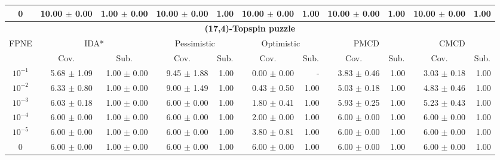 \documentclass[letterpaper]{article}
\begin{document}
\begin{table}[t]
\begin{tabular}{| c | r  r | r  r | r  r | r  r | r  r |}
0 	& 10.00 $\pm$ 0.00	& 1.00  $\pm$ 0.00 	& 10.00 $\pm$ 0.00	& 1.00 	& 10.00 $\pm$ 0.00	& 1.00 	& 10.00 $\pm$ 0.00	& 1.00 	& 10.00 $\pm$ 0.00	& 1.00 	\\

\hline
\hline
\multicolumn{11}{|c|}{\textbf{(17,4)-Topspin puzzle}} \\
\hline
\multirow{2}{*}{FPNE}	& \multicolumn{2}{|c|}{IDA*} 	& \multicolumn{2}{|c|}{Pessimistic} 	& \multicolumn{2}{|c|}{Optimistic} 	& \multicolumn{2}{|c|}{PMCD} 	& \multicolumn{2}{|c|}{CMCD} 	\\
\cline{2-11}
	& \multicolumn{1}{c}{Cov.} & \multicolumn{1}{c|}{Sub.} 	& \multicolumn{1}{c}{Cov.} & \multicolumn{1}{c|}{Sub.} 	& \multicolumn{1}{c}{Cov.} & \multicolumn{1}{c|}{Sub.} 	& \multicolumn{1}{c}{Cov.} & \multicolumn{1}{c|}{Sub.} 	& \multicolumn{1}{c}{Cov.} & \multicolumn{1}{c|}{Sub.} 	\\
\hline
$10^{-1}$	& 5.68 $\pm$ 1.09	& 1.00 $\pm$ 0.00	& 9.45 $\pm$ 1.88	& 1.00	& 0.00 $\pm$ 0.00	& - 	& 3.83 $\pm$ 0.46	& 1.00	& 3.03 $\pm$ 0.18	& 1.00	\\

$10^{-2}$	& 6.33 $\pm$ 0.80	& 1.00 $\pm$ 0.00	& 9.00 $\pm$ 1.49	& 1.00	& 0.43 $\pm$ 0.50	& 1.00	& 5.03 $\pm$ 0.18	& 1.00	& 4.83 $\pm$ 0.46	& 1.00	\\

$10^{-3}$	& 6.03 $\pm$ 0.18	& 1.00 $\pm$ 0.00	& 6.00 $\pm$ 0.00	& 1.00	& 1.80 $\pm$ 0.41	& 1.00	& 5.93 $\pm$ 0.25	& 1.00	& 5.23 $\pm$ 0.43	& 1.00	\\

$10^{-4}$	& 6.00 $\pm$ 0.00	& 1.00 $\pm$ 0.00	& 6.00 $\pm$ 0.00	& 1.00	& 2.00 $\pm$ 0.00	& 1.00	& 6.00 $\pm$ 0.00	& 1.00	& 6.00 $\pm$ 0.00	& 1.00	\\

$10^{-5}$	& 6.00 $\pm$ 0.00	& 1.00 $\pm$ 0.00	& 6.00 $\pm$ 0.00	& 1.00	& 3.80 $\pm$ 0.81	& 1.00	& 6.00 $\pm$ 0.00	& 1.00	& 6.00 $\pm$ 0.00	& 1.00	\\

0 	& 6.00 $\pm$ 0.00	& 1.00  $\pm$ 0.00 	& 6.00 $\pm$ 0.00	& 1.00 	& 6.00 $\pm$ 0.00	& 1.00 	& 6.00 $\pm$ 0.00	& 1.00 	& 6.00 $\pm$ 0.00	& 1.00 	\\




\end{tabular}
\end{table}
\end{document}
